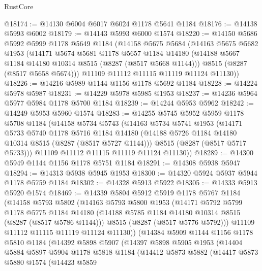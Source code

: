 \begin{lexlean}{RustCore}
\begin{coremodule}
@18174 := @14130 @6004 @6017 @6024 @1178 @5641 @1184
@18176 := @14138 @5993 @6002
@18179 := @14143 @5993 @6000 @1574
@18220 := @14150
    @5686
    @5992
    @5999
    @1178
    @5649
    @1184
    (@14158
      @5675
      @5684
      (@14163
        @5675
        @5682
        @1953
        (@14171
          @5674
          @5681
          @1178
          @5657
          @1184
          @14180
          (@14188 @5667 @1184 @14180 @10314 @8515 (@8287 (@8517 @5668 @1144)))
          @8515
          (@8287 (@8517 @5658 @5674)))
        @11109
        @11112
        @11115
        @11119
        @11124
        @11130))
@18226 := @14216 @5989 @1144 @1156 @1178 @5692 @1184
@18228 := @14224 @5978 @5987
@18231 := @14229 @5978 @5985 @1953
@18237 := @14236 @5964 @5977 @5984 @1178 @5700 @1184
@18239 := @14244 @5953 @5962
@18242 := @14249 @5953 @5960 @1574
@18283 := @14255
    @5745
    @5952
    @5959
    @1178
    @5708
    @1184
    (@14158
      @5734
      @5743
      (@14163
        @5734
        @5741
        @1953
        (@14171
          @5733
          @5740
          @1178
          @5716
          @1184
          @14180
          (@14188 @5726 @1184 @14180 @10314 @8515 (@8287 (@8517 @5727 @1144)))
          @8515
          (@8287 (@8517 @5717 @5733)))
        @11109
        @11112
        @11115
        @11119
        @11124
        @11130))
@18289 := @14300 @5949 @1144 @1156 @1178 @5751 @1184
@18291 := @14308 @5938 @5947
@18294 := @14313 @5938 @5945 @1953
@18300 := @14320 @5924 @5937 @5944 @1178 @5759 @1184
@18302 := @14328 @5913 @5922
@18305 := @14333 @5913 @5920 @1574
@18469 := @14339
    @5804
    @5912
    @5919
    @1178
    @5767
    @1184
    (@14158
      @5793
      @5802
      (@14163
        @5793
        @5800
        @1953
        (@14171
          @5792
          @5799
          @1178
          @5775
          @1184
          @14180
          (@14188 @5785 @1184 @14180 @10314 @8515 (@8287 (@8517 @5786 @1144)))
          @8515
          (@8287 (@8517 @5776 @5792)))
        @11109
        @11112
        @11115
        @11119
        @11124
        @11130))
    (@14384
      @5909
      @1144
      @1156
      @1178
      @5810
      @1184
      (@14392
        @5898
        @5907
        (@14397
          @5898
          @5905
          @1953
          (@14404
            @5884
            @5897
            @5904
            @1178
            @5818
            @1184
            (@14412
              @5873
              @5882
              (@14417
                @5873
                @5880
                @1574
                (@14423
                  @5859

\end{coremodule}
\end{lexlean}
